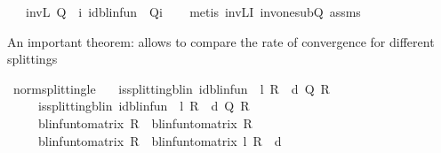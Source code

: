 \begin{isabellebody}
\ \ \ {\isachardoublequoteopen}inv\isactrlsub L\ Q\ {\isacharequal}{\kern0pt}\ {\isacharparenleft}{\kern0pt}{\isasymSum}i{\isachardot}{\kern0pt}\ {\isacharparenleft}{\kern0pt}id{\isacharunderscore}{\kern0pt}blinfun\ {\isacharminus}{\kern0pt}\ Q{\isacharparenright}{\kern0pt}{\isacharcircum}{\kern0pt}{\isacharcircum}{\kern0pt}i{\isacharparenright}{\kern0pt}{\isachardoublequoteclose}\isanewline
%
\isadelimproof
\ \ %
\endisadelimproof
%
\isatagproof
{}\isamarkupfalse%
\ {\isacharparenleft}{\kern0pt}metis\ inv\isactrlsub L{\isacharunderscore}{\kern0pt}I\ inv{\isacharunderscore}{\kern0pt}one{\isacharunderscore}{\kern0pt}sub{\isacharunderscore}{\kern0pt}Q\ assms{\isacharparenright}{\kern0pt}%
\endisatagproof
{\isafoldproof}%
%
\isadelimproof
%
\endisadelimproof
%
\begin{isamarkuptext}%
An important theorem: allows to compare the rate of convergence for different splittings%
\end{isamarkuptext}\isamarkuptrue%
\isamarkupfalse%
\ norm{\isacharunderscore}{\kern0pt}splitting{\isacharunderscore}{\kern0pt}le{\isacharcolon}{\kern0pt}\isanewline
\ \ \ {\isachardoublequoteopen}is{\isacharunderscore}{\kern0pt}splitting{\isacharunderscore}{\kern0pt}blin\ {\isacharparenleft}{\kern0pt}id{\isacharunderscore}{\kern0pt}blinfun\ {\isacharminus}{\kern0pt}\ l\ {\isacharasterisk}{\kern0pt}\isactrlsub R\ {\isasymP}\ d{\isacharparenright}{\kern0pt}\ Q{}\ R{}{\isachardoublequoteclose}\isanewline
\ \ \ \ \ {\isachardoublequoteopen}is{\isacharunderscore}{\kern0pt}splitting{\isacharunderscore}{\kern0pt}blin\ {\isacharparenleft}{\kern0pt}id{\isacharunderscore}{\kern0pt}blinfun\ {\isacharminus}{\kern0pt}\ l\ {\isacharasterisk}{\kern0pt}\isactrlsub R\ {\isasymP}\ d{\isacharparenright}{\kern0pt}\ Q{}\ R{}{\isachardoublequoteclose}\isanewline
\ \ \ \ \ {\isachardoublequoteopen}{\isacharparenleft}{\kern0pt}blinfun{\isacharunderscore}{\kern0pt}to{\isacharunderscore}{\kern0pt}matrix\ R{}{\isacharparenright}{\kern0pt}\ {\isasymle}\ {\isacharparenleft}{\kern0pt}blinfun{\isacharunderscore}{\kern0pt}to{\isacharunderscore}{\kern0pt}matrix\ R{}{\isacharparenright}{\kern0pt}{\isachardoublequoteclose}\isanewline
\ \ \ \ \ {\isachardoublequoteopen}{\isacharparenleft}{\kern0pt}blinfun{\isacharunderscore}{\kern0pt}to{\isacharunderscore}{\kern0pt}matrix\ R{}{\isacharparenright}{\kern0pt}\ {\isasymle}\ {\isacharparenleft}{\kern0pt}blinfun{\isacharunderscore}{\kern0pt}to{\isacharunderscore}{\kern0pt}matrix\ {\isacharparenleft}{\kern0pt}l\ {\isacharasterisk}{\kern0pt}\isactrlsub R\ {\isasymP}\ d{\isacharparenright}{\kern0pt}{\isacharparenright}{\kern0pt}{\isachardoublequoteclose}\isanewline

\end{isabellebody}

